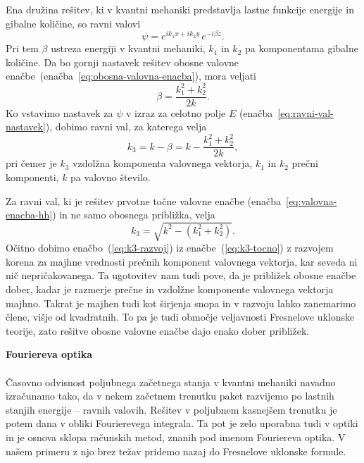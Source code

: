 Ena družina rešitev, ki v kvantni mehaniki predstavlja lastne funkcije
energije in gibalne količine, so ravni valovi
\begin{equation}
\psi=e^{ik_{1}x+ik_{2}y}\, e^{-i\beta z}.
\label{eq:ravni-val-nastavek-obosni}
\end{equation}
Pri tem $\beta$ ustreza energiji v kvantni mehaniki, $k_{1}$ in
$k_{2}$ pa komponentama gibalne količine. Da bo gornji nastavek rešitev
obosne valovne enačbe~(enačba~\ref{eq:obosna-valovna-enacba}), mora veljati 
\begin{equation}
\beta=\frac{k_{1}^{2}+k_{2}^{2}}{2k}.
\end{equation}
Ko vstavimo nastavek za $\psi$ v izraz za celotno polje $E$ 
(enačba~\ref{eq:ravni-val-nastavek}), dobimo ravni val, za katerega velja 
\begin{equation}
k_{3}=k-\beta=k-\frac{k_{1}^{2}+k_{2}^{2}}{2k},\label{eq:k3-razvoj}
\end{equation}
 pri čemer je $k_{3}$ vzdolžna komponenta valovnega vektorja, $k_{1}$ in
$k_{2}$ prečni komponenti, $k$ pa valovno število. 

Za ravni val, ki je rešitev prvotne točne valovne enačbe (enačba~\ref{eq:valovna-enacba-hh})
in ne samo obosnega približka, velja 
\begin{equation}
k_{3}=\sqrt{k^{2}-(k_{1}^{2}+k_{2}^{2})}.\label{eq:k3-tocno}
\end{equation}
Očitno dobimo enačbo~(\ref{eq:k3-razvoj}) iz enačbe~(\ref{eq:k3-tocno})
z razvojem korena za majhne vrednosti prečnih komponent valovnega
vektorja, kar seveda ni nič nepričakovanega. Ta ugotovitev nam tudi
pove, da je približek obosne enačbe dober, kadar je razmerje prečne
in vzdolžne komponente valovnega vektorja majhno. Takrat je majhen
tudi kot širjenja snopa in v razvoju lahko zanemarimo člene, višje
od kvadratnih. To pa je tudi območje veljavnosti Fresnelove uklonske
teorije, zato rešitve obosne valovne enačbe dajo enako dober približek.

\begin{remark}{{\bf Fouriereva optika}}\\ \\
Časovno odvisnost poljubnega začetnega
stanja v kvantni mehaniki navadno izračunamo tako, da v nekem začetnem
trenutku paket razvijemo po lastnih stanjih energije -- ravnih valovih.
Rešitev v poljubnem kasnejšem trenutku je potem dana v obliki Fourierevega
integrala. Ta pot je zelo uporabna tudi v optiki in je osnova sklopa
računskih metod, znanih pod imenom Fouriereva optika. V našem primeru
z njo brez težav pridemo nazaj do Fresnelove uklonske formule.
\end{remark}

